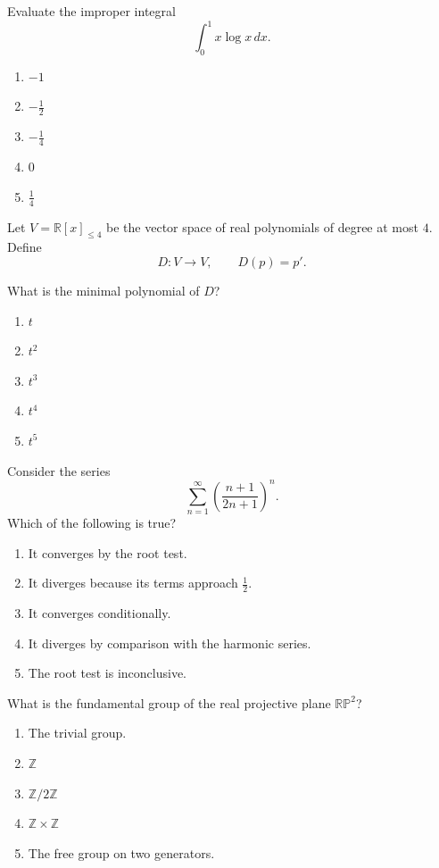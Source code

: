 \begin{exercise}
Evaluate the improper integral
\[
\int_0^1 x\log x\,dx.
\]
\begin{enumerate}[label=(\Alph*)]
\item $-1$
\item $-\frac12$
\item $-\frac14$
\item $0$
\item $\frac14$
\end{enumerate}
\end{exercise}

\begin{exercise}
Let $V=\mathbb R[x]_{\leq4}$ be the
vector space of real polynomials of
degree at most $4$. Define
\[
D:V\to V,\qquad D(p)=p'.
\]

What is the minimal polynomial of $D$?
\begin{enumerate}[label=(\Alph*)]
\item $t$
\item $t^2$
\item $t^3$
\item $t^4$
\item $t^5$
\end{enumerate}
\end{exercise}

\begin{exercise}
Consider the series
\[
\sum_{n=1}^{\infty}
\left(\frac{n+1}{2n+1}\right)^n.
\]
Which of the following is true?
\begin{enumerate}[label=(\Alph*)]
\item It converges by the root test.
\item It diverges because its terms
approach $\frac12$.
\item It converges conditionally.
\item It diverges by comparison with
the harmonic series.
\item The root test is inconclusive.
\end{enumerate}
\end{exercise}

\begin{exercise}
What is the fundamental group of the
real projective plane $\mathbb{RP}^2$?
\begin{enumerate}[label=(\Alph*)]
\item The trivial group.
\item $\mathbb Z$
\item $\mathbb Z/2\mathbb Z$
\item $\mathbb Z\times\mathbb Z$
\item The free group on two generators.
\end{enumerate}
\end{exercise}

